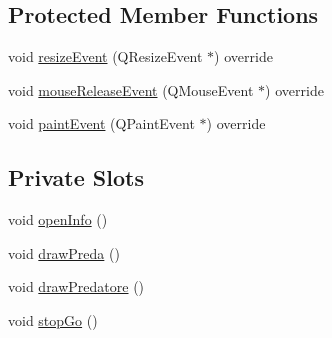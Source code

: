 \subsection*{Protected Member Functions}
\begin{DoxyCompactItemize}
\item 
void \hyperlink{classAcquarioView_a0e079aa6c82990024c12b64933c3f1a9_a0e079aa6c82990024c12b64933c3f1a9}{resize\+Event} (Q\+Resize\+Event $\ast$) override
\item 
void \hyperlink{classAcquarioView_a147fcc39de40876b6fe694fff6f16616_a147fcc39de40876b6fe694fff6f16616}{mouse\+Release\+Event} (Q\+Mouse\+Event $\ast$) override
\item 
void \hyperlink{classAcquarioView_a1cc4e4cb7eee48bc6022523dc17f0c77_a1cc4e4cb7eee48bc6022523dc17f0c77}{paint\+Event} (Q\+Paint\+Event $\ast$) override
\end{DoxyCompactItemize}
\subsection*{Private Slots}
\begin{DoxyCompactItemize}
\item 
void \hyperlink{classAcquarioView_a30ae8edae52647aaf9b3386cf6991b72_a30ae8edae52647aaf9b3386cf6991b72}{open\+Info} ()
\item 
void \hyperlink{classAcquarioView_a39825ed2402d0cae4c9a7bbc050c21be_a39825ed2402d0cae4c9a7bbc050c21be}{draw\+Preda} ()
\item 
void \hyperlink{classAcquarioView_ac515fba6397d1fb32b92b6de5c08bc64_ac515fba6397d1fb32b92b6de5c08bc64}{draw\+Predatore} ()
\item 
void \hyperlink{classAcquarioView_a1387d7b13dd4969307de38b915b2b4d4_a1387d7b13dd4969307de38b915b2b4d4}{stop\+Go} ()
\end{DoxyCompactItemize}
